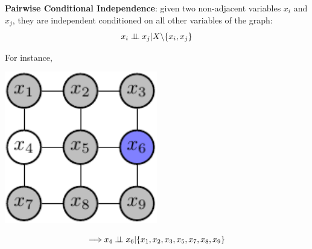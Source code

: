 \begin{corollary}
\textbf{Pairwise Conditional Independence}:
  given two non-adjacent variables $x_i$ and $x_j$, they are independent conditioned on all other variables of the graph:
 \begin{equation*}
  x_i \perp\!\!\!\perp x_j | X \backslash \{x_i,x_j\}
 \end{equation*}
\end{corollary}
For instance,  \newline\newline 
\begin{minipage}[c]{0.5\textwidth}   
	\centering
	\includegraphics[width=0.5\textwidth]{./Figures/markov_net_2.pdf}
\end{minipage}
\begin{minipage}[c]{0.4\textwidth}
   \begin{equation*}
  \Longrightarrow  x_4 \perp\!\!\!\perp x_6 |\{x_1,x_2,x_3,x_5,x_7,x_8,x_9\}
   \end{equation*}
\end{minipage}


